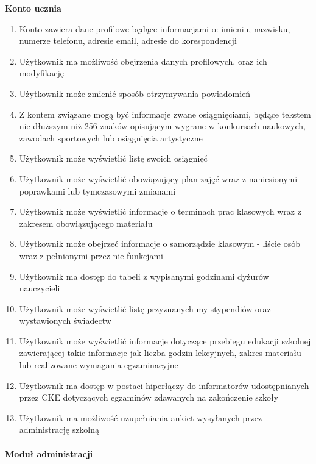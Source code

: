 \documentclass{article}
\begin{document}
\textbf{Konto ucznia}
\begin{enumerate}
	\item Konto zawiera dane profilowe będące informacjami o: imieniu, nazwisku, numerze telefonu, adresie email, adresie do korespondencji
	\item Użytkownik ma możliwość obejrzenia danych profilowych, oraz ich modyfikację
	\item Użytkownik może zmienić sposób otrzymywania powiadomień
	\item Z kontem związane mogą być informacje zwane osiągnięciami, będące tekstem nie dłuższym niż 256 znaków opisującym wygrane w konkursach naukowych, zawodach sportowych lub osiągnięcia artystyczne
	\item Użytkownik może wyświetlić listę swoich osiągnięć
	\item Użytkownik może wyświetlić obowiązujący plan zajęć wraz z naniesionymi poprawkami lub tymczasowymi zmianami
	\item Użytkownik może wyświetlić informacje o terminach prac klasowych wraz z zakresem obowiązującego materiału
	\item Użytkownik może obejrzeć informacje o samorządzie klasowym - liście osób wraz z pełnionymi przez nie funkcjami
	\item Użytkownik ma dostęp do tabeli z wypisanymi godzinami dyżurów nauczycieli
	\item Użytkownik może wyświetlić listę przyznanych my stypendiów oraz wystawionych świadectw
	\item Użytkownik może wyświetlić informacje dotyczące przebiegu edukacji szkolnej zawierającej takie informacje jak liczba godzin lekcyjnych, zakres materiału lub realizowane wymagania egzaminacyjne
	\item Użytkownik ma dostęp w postaci hiperłączy do informatorów udostępnianych przez CKE dotyczących egzaminów zdawanych na zakończenie szkoły
	\item Użytkownik ma możliwość uzupełniania ankiet wysyłanych przez administrację szkolną
	
\end{enumerate}

\paragraph{Moduł administracji} \mbox{}\\
\end{document}
